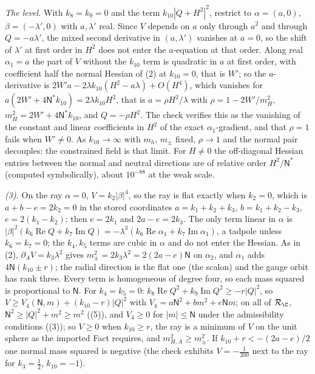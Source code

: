 \emph{The level.} With $k_{8} = k_{9} = 0$ and the term $k_{10}|Q + H^{2}|^{2}$, restrict to $\alpha = (a, 0)$, $\beta = (-\lambda', 0)$ with $a, \lambda'$ real. Since $V$ depends on $a$ only through $a^{2}$ and through $Q = -a\lambda'$, the mixed second derivative in $(a, \lambda')$ vanishes at $a = 0$, so the shift of $\lambda'$ at first order in $H^{2}$ does not enter the $a$-equation at that order. Along real $\alpha_{1} = a$ the part of $V$ without the $k_{10}$ term is quadratic in $a$ at first order, with coefficient half the normal Hessian of (2) at $k_{10} = 0$, that is $W'$; so the $a$-derivative is $2W'a - 2\lambda k_{10}(H^{2} - a\lambda) + O(H^{4})$, which vanishes for $a(2W' + 4\mathsf{N}^{*}k_{10}) = 2\lambda k_{10}H^{2}$, that is $a = \rho H^{2}/\lambda$ with $\rho = 1 - 2W'/m_{H}^{2}$, $m_{H}^{2} = 2W' + 4\mathsf{N}^{*}k_{10}$, and $Q = -\rho H^{2}$. The check verifies this as the vanishing of the constant and linear coefficients in $H^{2}$ of the exact $\alpha_{1}$-gradient, and that $\rho = 1$ fails when $W' \ne 0$. As $k_{10} \to \infty$ with $m_{h}$, $m_{\pm}$ fixed, $\rho \to 1$ and the normal pair decouples: the constrained field is that limit. For $H \ne 0$ the off-diagonal Hessian entries between the normal and neutral directions are of relative order $H^{2}/\mathsf{N}^{*}$ (computed symbolically), about $10^{-88}$ at the weak scale.

\emph{(3).} On the ray $\alpha = 0$, $V = k_{2}|\beta|^{4}$, so the ray is flat exactly when $k_{2} = 0$, which is $a + b - e = 2k_{2} = 0$ in the stored coordinates $a = k_{1} + k_{2} + k_{3}$, $b = k_{1} + k_{2} - k_{3}$, $e = 2(k_{1} - k_{2})$; then $e = 2k_{1}$ and $2a - e = 2k_{3}$. The only term linear in $\alpha$ is $|\beta|^{2}(k_{6}\operatorname{Re}Q + k_{7}\operatorname{Im}Q) = -\lambda^{3}(k_{6}\operatorname{Re}\alpha_{1} + k_{7}\operatorname{Im}\alpha_{1})$, a tadpole unless $k_{6} = k_{7} = 0$; the $k_{4}, k_{5}$ terms are cubic in $\alpha$ and do not enter the Hessian. As in (2), $\partial_{A}V = k_{3}\lambda^{2}$ gives $m_{\pm}^{2} = 2k_{3}\lambda^{2} = 2(2a - e)\mathsf{N}$ on $\alpha_{2}$, and $\alpha_{1}$ adds $4\mathsf{N}(k_{10} \pm r)$; the radial direction is the flat one (the scalon) and the gauge orbit has rank three. Every term is homogeneous of degree four, so each mass squared is proportional to $\mathsf{N}$. For $k_{4} = k_{5} = 0$: $k_{8}\operatorname{Re}Q^{2} + k_{9}\operatorname{Im}Q^{2} \ge -r|Q|^{2}$, so $V \ge V_{4}(\mathsf{N}, m) + (k_{10} - r)|Q|^{2}$ with $V_{4} = a\mathsf{N}^{2} + bm^{2} + e\mathsf{N}m$; on all of $\mathcal{R}_{\C}$, $\mathsf{N}^{2} \ge |Q|^{2} + m^{2} \ge m^{2}$ ((5)), and $V_{4} \ge 0$ for $|m| \le \mathsf{N}$ under the admissibility conditions ((3)); so $V \ge 0$ when $k_{10} \ge r$, the ray is a minimum of $V$ on the unit sphere as the imported Fact requires, and $m_{H,A}^{2} \ge m_{\pm}^{2}$. If $k_{10} + r < -(2a - e)/2$ one normal mass squared is negative (the check exhibits $V = -\tfrac{1}{200}$ next to the ray for $k_{3} = \tfrac12$, $k_{10} = -1$).

